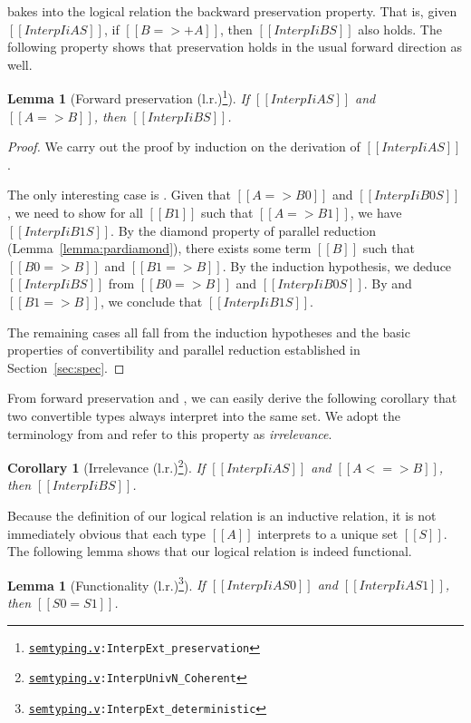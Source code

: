 \documentclass[\ifpublic nolinenum\else\fi,online,OA]{jfp}
\newcommand{\dotv}[2]{\href{#1}{\texttt{#1}}{\texttt{:#2}}}
\newtheorem{lemma}[theorem]{Lemma}
\newtheorem{corollary}[theorem]{Corollary}
\theoremstyle{definition}
\begin{document}
 bakes into the logical relation the backward preservation
property. That is, given $[[Interp I i A S]]$, if $[[B =>+ A]]$, then
$[[Interp I i B S]]$ also holds. The following property shows that
preservation holds in the usual forward direction as well.

\begin{lemma}[Forward preservation (l.r.)\footnote{\dotv{semtyping.v}{InterpExt\_preservation}}]
  \label{lemma:interppreservation}
  If $[[Interp I i A S]]$ and $[[A => B]]$, then $[[Interp I i B S]]$.
\end{lemma}

\begin{proof}
  We carry out the proof by induction on the derivation of
  $[[Interp I i A S]]$.

  The only interesting case is . Given that
  $[[A => B0]]$ and $[[Interp I i B0 S]]$, we need to show
  for all  $[[B1]]$ such that $[[A => B1]]$, we have $[[Interp I i B1
  S]]$. By the diamond property of parallel reduction
  (Lemma~\ref{lemma:pardiamond}), there exists some term $[[B]]$ such
  that $[[B0 => B]]$ and $[[B1 => B]]$. By the induction hypothesis,
  we deduce $[[Interp I i B S]]$ from $[[B0 => B]]$ and $[[Interp I i
  B0 S]]$. By  and $[[B1 => B]]$, we conclude that
  $[[Interp I i B1 S]]$.

  The remaining cases all fall from the induction hypotheses and the basic
  properties of convertibility and parallel reduction established in
  Section~\ref{sec:spec}.
\end{proof}

From forward preservation and , we can easily
derive the following corollary that two convertible types always interpret
into the same set. We adopt the terminology from \citet{martin-lof-a-la-coq}
and refer to this property as \emph{irrelevance}.

\begin{corollary}[Irrelevance (l.r.)\footnote{\dotv{semtyping.v}{InterpUnivN\_Coherent}}]
  \label{lemma:logrelcoherence}
  If $[[Interp I i A S]]$ and $[[A <=> B]]$, then $[[Interp I i B S]]$.
\end{corollary}

Because the definition of our logical relation is an inductive relation, it is
not immediately obvious that each type $[[A]]$ interprets to a unique set $[[S]]$.
The following lemma shows that our logical relation is indeed functional.

\begin{lemma}[Functionality (l.r.)\footnote{\dotv{semtyping.v}{InterpExt\_deterministic}}]
  \label{lemma:logreldeter}
  If $[[Interp I i A S0]]$ and $[[Interp I i A S1]]$, then $[[S0 = S1]]$.
\end{lemma}
\end{document}
